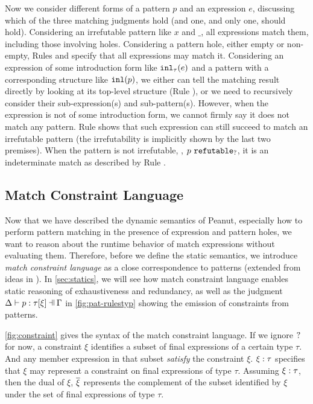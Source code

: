 Now we consider different forms of a pattern $p$ and an expression $e$, discussing which of the three matching judgments hold (and one, and only one, should hold).
Considering an irrefutable pattern like $x$ and $\_$, all expressions match them, including those involving holes.
Considering a pattern hole, either empty or non-empty, Rules \MMEHole and \MMHole specify that all expressions may match it.
Considering an expression of some introduction form like $\mathtt{inl}_{\tau}({e})$ and a pattern with a corresponding structure like $\mathtt{inl}(p)$, we either can tell the matching result directly by looking at its top-level structure (Rule \NMConfR), or we need to recursively consider their sub-expression(s) and sub-pattern(s).
However, when the expression is not of some introduction form, we cannot firmly say it does not match any pattern. Rule \MNotIntroPair shows that such expression can still succeed to match an irrefutable pattern (the irrefutability is implicitly shown by the last two premises). When the pattern is not irrefutable, \ie, $p ~\mathtt{refutable}_?$, it is an indeterminate match as described by Rule \MMNotIntro.

\subsection{Match Constraint Language}\label{sec:constraint}
Now that we have described the dynamic semantics of Peanut,
especially how to perform pattern matching in the presence of expression and pattern holes,
we want to reason about the runtime behavior of match expressions without evaluating them.
Therefore, before we define the static semantics, we introduce \textit{match constraint language}
as a close correspondence to patterns (extended from ideas in \cite{Harper2012}).
In \autoref{sec:statics}, we will see how match constraint language enables static reasoning of exhaustiveness and redundancy, as well as the judgment $\chpattyp{p}{\tau}{\xi}{\Gamma}{\Delta}$ in \autoref{fig:pat-rulestyp} showing the emission of constraints from patterns.



\autoref{fig:constraint} gives the syntax of the match constraint language. 
If we ignore $\mathtt{?}$ for now, a constraint $\xi$ identifies a subset of final expressions of a certain type $\tau$.
And any member expression in that subset \textit{satisfy} the constraint $\xi$.
$\xi : \tau$ specifies that $\xi$ may represent a constraint on final expressions of type $\tau$.
Assuming $\xi : \tau$, then the dual of $\xi$, $\overline{\xi}$ represents the complement of the subset identified by $\xi$ under the set of final expressions of type $\tau$.

